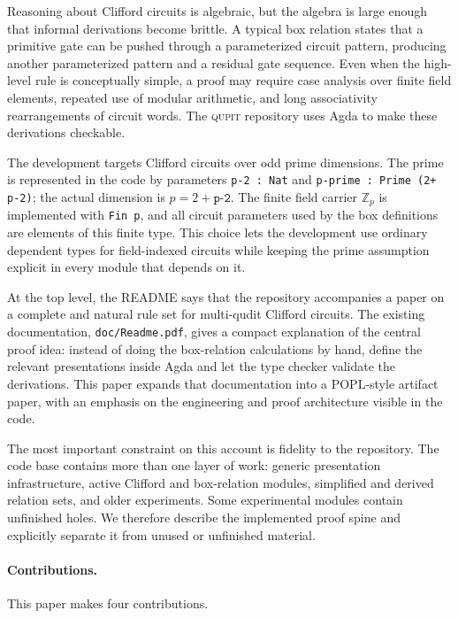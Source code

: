 \documentclass[sigplan,screen,review,anonymous]{acmart}
\newcommand{\Agda}{Agda\xspace}
\newcommand{\Qupit}{\textsc{qupit}\xspace}
\newcommand{\Zp}{\mathbb{Z}_p}
\newcommand{\file}[1]{\texttt{#1}}
\begin{document}
Reasoning about Clifford circuits is algebraic, but the algebra is
large enough that informal derivations become brittle.  A typical box
relation states that a primitive gate can be pushed through a
parameterized circuit pattern, producing another parameterized pattern
and a residual gate sequence.  Even when the high-level rule is
conceptually simple, a proof may require case analysis over finite
field elements, repeated use of modular arithmetic, and long
associativity rearrangements of circuit words.  The \Qupit repository
uses \Agda to make these derivations checkable.

The development targets Clifford circuits over odd prime dimensions.
The prime is represented in the code by parameters
\texttt{p-2 : Nat} and \texttt{p-prime : Prime (2+ p-2)}; the actual
dimension is \(p = 2 + \texttt{p-2}\).  The finite field carrier
\(\Zp\) is implemented with \texttt{Fin p}, and all circuit
parameters used by the box definitions are elements of this finite
type.  This choice lets the development use ordinary dependent types
for field-indexed circuits while keeping the prime assumption explicit
in every module that depends on it.

At the top level, the README says that the repository accompanies a
paper on a complete and natural rule set for multi-qudit Clifford
circuits.  The existing documentation, \file{doc/Readme.pdf}, gives a
compact explanation of the central proof idea: instead of doing the
box-relation calculations by hand, define the relevant presentations
inside \Agda and let the type checker validate the derivations.  This
paper expands that documentation into a POPL-style artifact paper,
with an emphasis on the engineering and proof architecture visible in
the code.

The most important constraint on this account is fidelity to the
repository.  The code base contains more than one layer of work:
generic presentation infrastructure, active Clifford and box-relation
modules, simplified and derived relation sets, and older experiments.
Some experimental modules contain unfinished holes.  We therefore
describe the implemented proof spine and explicitly separate it from
unused or unfinished material.

\paragraph{Contributions.}
This paper makes four contributions.
\end{document}

